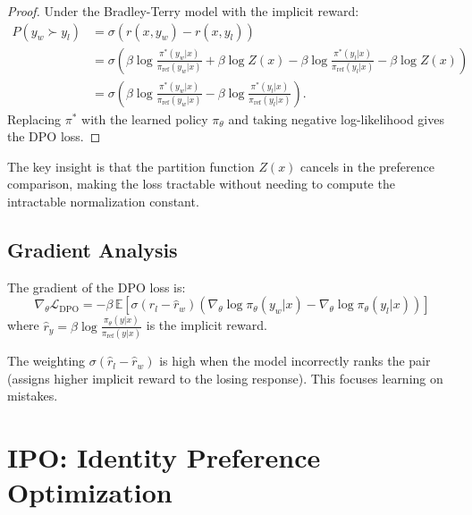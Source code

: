 \begin{proof}
    Under the Bradley-Terry model with the implicit reward:
    \begin{align*}
        P(y_w \succ y_l) & = \sigma(r(x, y_w) - r(x, y_l))                                                                                                                                              \\
                         & = \sigma\left( \beta \log \frac{\pi^*(y_w|x)}{\pi_{\text{ref}}(y_w|x)} + \beta \log Z(x) - \beta \log \frac{\pi^*(y_l|x)}{\pi_{\text{ref}}(y_l|x)} - \beta \log Z(x) \right) \\
                         & = \sigma\left( \beta \log \frac{\pi^*(y_w|x)}{\pi_{\text{ref}}(y_w|x)} - \beta \log \frac{\pi^*(y_l|x)}{\pi_{\text{ref}}(y_l|x)} \right).
    \end{align*}
    Replacing $\pi^*$ with the learned policy $\pi_\theta$ and taking negative log-likelihood gives the DPO loss.
\end{proof}

\begin{remark}
    The key insight is that the partition function $Z(x)$ cancels in the preference comparison, making the loss tractable without needing to compute the intractable normalization constant.
\end{remark}

\subsection{Gradient Analysis}

\begin{proposition}
    The gradient of the DPO loss is:
    \[
        \nabla_\theta \mathcal{L}_{\text{DPO}} = -\beta \, \mathbb{E} \left[ \sigma(\hat{r}_l - \hat{r}_w) \left( \nabla_\theta \log \pi_\theta(y_w|x) - \nabla_\theta \log \pi_\theta(y_l|x) \right) \right]
    \]
    where $\hat{r}_y = \beta \log \frac{\pi_\theta(y|x)}{\pi_{\text{ref}}(y|x)}$ is the implicit reward.
\end{proposition}

\begin{remark}
    The weighting $\sigma(\hat{r}_l - \hat{r}_w)$ is high when the model incorrectly ranks the pair (assigns higher implicit reward to the losing response). This focuses learning on mistakes.
\end{remark}

\section{IPO: Identity Preference Optimization}

